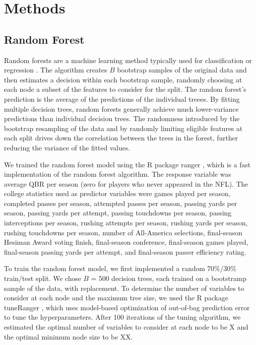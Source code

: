 \documentclass{article}
\begin{document}
\section{Methods}
\label{sec:methods}

\subsection{Random Forest}

Random forests are a machine learning method typically used for classification or regression \citep{breiman_random_2001}. The algorithm creates $B$ bootstrap samples of the original data and then estimates a decision within each bootstrap sample, randomly choosing at each node a subset of the features to consider for the split. The random forest's prediction is the average of the predictions of the individual treees. By fitting multiple decision trees, random forests generally achieve much lower-variance predictions than individual decision trees. The randomness introduced by the bootstrap resampling of the data and by randomly limiting eligible features at each split drives down the correlation between the trees in the forest, further reducing the variance of the fitted values.

We trained the random forest model using the R package ranger \citep{wright_ranger_2015}, which is a fast implementation of the random forest algorithm. The response variable was average QBR per season (zero for players who never appeared in the NFL). The college statistics used as predictor variables were games played per season, completed passes per season, attempted passes per season, passing yards per season, passing yards per attempt, passing touchdowns per season, passing interceptions per season, rushing attempts per season, rushing yards per season, rushing touchdowns per season, number of All-America selections, final-season Hesiman Award voting finish, final-season conference, final-season games played, final-season passing yards per attempt, and final-season passer efficiency rating.

To train the random forest model, we first implemented a random 70\%/30\% train/test split. We chose $B$ = 500 decision trees, each trained on a bootstramp sample of the data, with replacement. To determine the number of variables to consider at each node and the maximum tree size, we used the R package tuneRanger \citep{probst_tuneranger_2018}, which uses model-based optimization of out-of-bag prediction error to tune the hyperparameters. After 100 iterations of the tuning algorithm, we estimated the optimal number of variables to consider at each node to be X and the optimal minimum node size to be XX.
\end{document}
